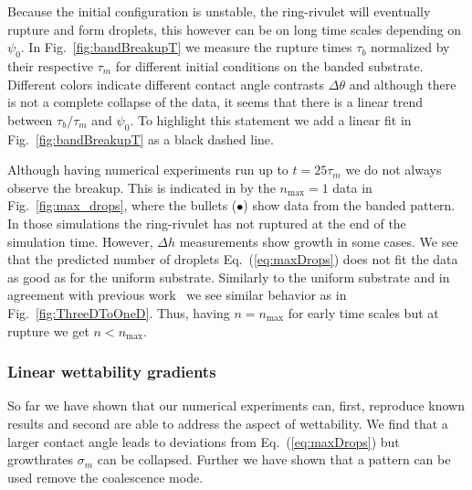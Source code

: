 \documentclass[twoside,twocolumn,9pt]{article}
\begin{document}
Because the initial configuration is unstable, the ring-rivulet will eventually rupture and form droplets, this however can be on long time scales depending on $\psi_0$.
In Fig.~\ref{fig:bandBreakupT} we measure the rupture times $\tau_b$ normalized by their respective $\tau_m$ for different initial conditions on the banded substrate.
Different colors indicate different contact angle contrasts $\Delta\theta$ and although there is not a complete collapse of the data, it seems that there is a linear trend between $\tau_b/\tau_m$ and $\psi_0$.
To highlight this statement we add a linear fit in Fig.~\ref{fig:bandBreakupT} as a black dashed line. 

Although having numerical experiments run up to $t = 25\tau_m$ we do not always observe the breakup. 
This is indicated in by the $n_{\max} = 1$ data in Fig.~\ref{fig:max_drops}, where the bullets (\textcolor{black}{$\bullet$}) show data from the banded pattern. 
In those simulations the ring-rivulet has not ruptured at the end of the simulation time.
However, $\Delta h$ measurements show growth in some cases.
We see that the predicted number of droplets Eq.~(\ref{eq:maxDrops}) does not fit the data as good as for the uniform substrate. 
Similarly to the uniform substrate and in agreement with previous work~\cite{gonzalezStabilityLiquidRing2013} we see similar behavior as in Fig.~\ref{fig:ThreeDToOneD}.
Thus, having $n = n_{\max}$ for early time scales but at rupture we get $n < n_{\max}$.

\subsubsection{Linear wettability gradients}\label{subsubsec:linwettgrad}
So far we have shown that our numerical experiments can, first, reproduce known results and second are able to address the aspect of wettability.
We find that a larger contact angle leads to deviations from Eq.~(\ref{eq:maxDrops}) but growthrates $\sigma_m$ can be collapsed.
Further we have shown that a pattern can be used remove the coalescence mode.
\end{document}
